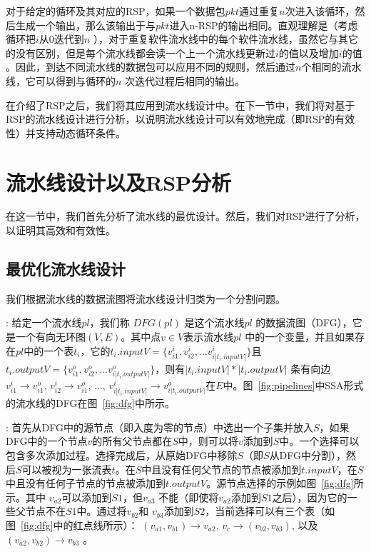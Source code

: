 对于给定的循环及其对应的RSP，如果一个数据包$pkt$通过重复$n$次进入该循环，然后生成一个输出，那么该输出于与$pkt$进入n-RSP的输出相同。直观理解是（考虑循环把$i$从$0$迭代到$n$ ），对于重复软件流水线中的每个软件流水线，虽然它与其它的没有区别，但是每个流水线都会读一个上一个流水线更新过$i$的值以及增加$i$的值 。因此，到达不同流水线的数据包可以应用不同的规则，然后通过$n$个相同的流水线，它可以得到与循环的$n$ 次迭代过程后相同的输出。

在介绍了RSP之后，我们将其应用到流水线设计中。在下一节中，我们将对基于RSP的流水线设计进行分析，以说明流水线设计可以有效地完成（即RSP的有效性）并支持动态循环条件。



\section{流水线设计以及RSP分析}
\label{sec:analysis}

在这一节中，我们首先分析了流水线的最优设计。然后，我们对RSP进行了分析，以证明其高效和有效性。

\subsection{最优化流水线设计}
我们根据流水线的数据流图将流水线设计归类为一个分割问题。

: 给定一个流水线$pl$，我们称 $DFG(pl)$ 是这个流水线$pl$ 的数据流图（DFG），它是一个有向无环图$(V, E)$。其中点$v \in V$表示流水线$pl$ 中的一个变量，并且如果存在$pl$中的一个表$t_i$，它的$t_i.inputV = \{v_{i1}^i, v_{i2}^i, ... v_{i|t_i.inputV|}^i\}$且$t_i.outputV = \{v_{i1}^o, v_{i2}^o, ... v_{i|t_i.outputV|}^o\}$，则有$|t_i.inputV| * |t_i.outputV|$ 条有向边 $v_{i1}^i \to v_{i1}^o$, $v_{i2}^i \to v_{i1}^o$, ..., $v_{i|t_i.inputV|}^i \to v_{i|t_i.outputV|}^o$在$E$中。图~\ref{fig:pipelines}中SSA形式的流水线的DFG在图~\ref{fig:dfg}中所示。

: 首先从DFG中的源节点（即入度为零的节点）中选出一个子集并放入$S$，如果DFG中的一个节点$v$的所有父节点都在$S$中，则可以将$v$添加到$S$中。一个选择可以包含多次添加过程。选择完成后，从原始DFG中移除$S$（即$S$从DFG中分割），然后$S$可以被视为一张流表$t$。在$S$中且没有任何父节点的节点被添加到$t.inputV$，在$S$中且没有任何子节点的节点被添加到$t.outputV$。源节点选择的示例如图~\ref{fig:dfg}所示。其中 $v_{a2}$可以添加到$S1$，但$v_{a3}$ 不能（即使将$v_{a2}$添加到$S1$之后），因为它的一些父节点不在$S1$中。通过将$v_{b2}$和 $v_{b3}$添加到$S2$，当前选择可以有三个表（如图~\ref{fig:dfg}中的红点线所示）： $(v_{a1}, v_{b1}) \rightarrow v_{a2}$, $v_c \rightarrow (v_{b2}, v_{b3})$, 以及 $(v_{a2}, v_{b2}) \rightarrow v_{b3}$ 。

